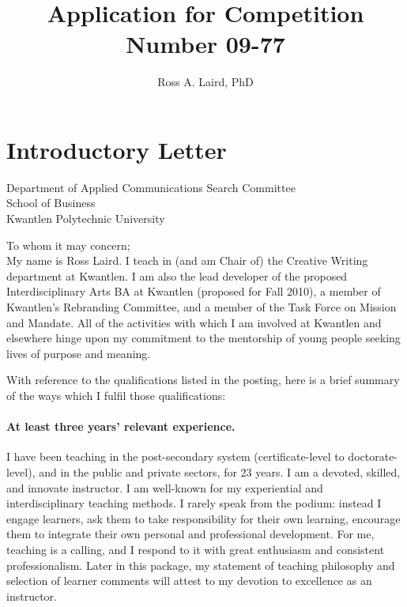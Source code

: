 \documentclass[10pt,DIV09,letterpaper,oneside,headsepline]{scrreprt}
\date{}
\title{\Large{Application for Competition Number 09-77\\}\vspace{.10in}}
\author{\large{Ross A. Laird, PhD}}
\begin{document}
\begin{center}
\maketitle
\end{center}
\tableofcontents
\chapter{Introductory Letter}

Department of Applied Communications Search Committee\\
School of Business\\
Kwantlen Polytechnic University\\

\bigskip

To whom it may concern;\\


My name is Ross Laird. I teach in (and am Chair of) the Creative Writing department at Kwantlen. I am also the lead developer of the proposed Interdisciplinary Arts BA at Kwantlen (proposed for Fall 2010), a member of Kwantlen's Rebranding Committee, and a member of the Task Force on Mission and Mandate. All of the activities with which I am involved at Kwantlen and elsewhere hinge upon my commitment to the mentorship of young people seeking lives of purpose and meaning.

With reference to the qualifications listed in the posting, here is a brief summary of the ways which I fulfil those qualifications:

\subsubsection{At least three years' relevant experience.}
I have been teaching in the post-secondary system (certificate-level to doctorate-level), and in the public and private sectors, for 23 years. I am a devoted, skilled, and innovate instructor. I am well-known for my experiential and interdisciplinary teaching methods. I rarely speak from the podium: instead I engage learners, ask them to take responsibility for their own learning, encourage them to integrate their own personal and professional development. For me, teaching is a calling, and I respond to it with great enthusiasm and consistent professionalism. Later in this package, my statement of teaching philosophy and selection of learner comments will attest to my devotion to excellence as an instructor.
\end{document}
